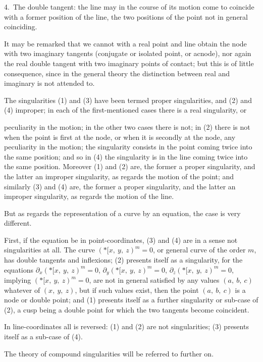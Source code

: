 \documentclass[12pt,a4paper,oneside]{book}
\begin{document}
4.~The double tangent: the line may in the course of its motion come to coincide with a former position of the line, the two positions of the point not in general coinciding.

It may be remarked that we cannot with a real point and line obtain the node with two imaginary tangents (conjugate or isolated point, or acnode), nor again the real double tangent with two imaginary points of contact; but this is of little consequence, since in the general theory the distinction between real and imaginary is not attended to.

The singularities (1) and (3) have been termed proper singularities, and (2) and (4) improper; in each of the first-mentioned cases there is a real singularity, or

\newpage
peculiarity in the motion; in the other two cases there is not; in (2) there is not when the point is first at the node, or when it is secondly at the node, any peculiarity in the motion; the singularity consists in the point coming twice into the same position; and so in (4) the singularity is in the line coming twice into the same position. Moreover (1) and (2) are, the former a proper singularity, and the latter an improper singularity, as regards the motion of the point; and similarly (3) and (4) are, the former a proper singularity, and the latter an improper singularity, as regards the motion of the line.

But as regards the representation of a curve by an equation, the case is very different.

First, if the equation be in point-coordinates, (3) and (4) are in a sense not singularities at all. The curve $(*\!\![ x,\ y,\ z)^{m}=0$, or general curve of the order $m$, has double tangents and inflexions; (2) presents itself as a singularity, for the equations $\partial_{x}(*\!\![ x,\ y,\ z)^{m}=0$, $\partial_{y}(*\!\![ x,\ y,\ z)^{m}=0$, $\partial_{z}(*\!\![ x,\ y,\ z)^{m}=0$, implying $(*\!\![ x,\ y,\ z)^{m}=0$, are not in general satisfied by any values $(a,\ b,\ c)$ whatever of $(x,\ y,\ z)$, but if such values exist, then the point $(a,\ b,\ c)$ is a node or double point; and (1) presents itself as a further singularity or sub-case of (2), a cusp being a double point for which the two tangents become coincident.

In line-coordinates all is reversed: (1) and (2) are not singularities; (3) presents itself as a sub-case of (4).

The theory of compound singularities will be referred to further on.
\end{document}
